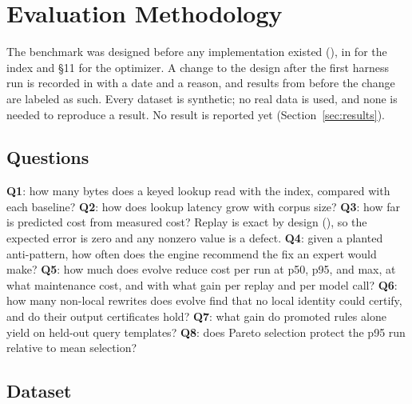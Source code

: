 \section{Evaluation Methodology}\label{sec:eval}

The benchmark was designed before any implementation existed (), in
 for the index and  \S11 for the optimizer.
A change to the design after the first harness run is recorded in
 with a date and a reason, and results from before the change
are labeled as such. Every dataset is synthetic; no real data is used, and none
is needed to reproduce a result. No result is reported yet
(Section~\ref{sec:results}).

\subsection{Questions}\label{sec:questions}

\textbf{Q1}: how many bytes does a keyed lookup read with the index, compared
with each baseline? \textbf{Q2}: how does lookup latency grow with corpus size?
\textbf{Q3}: how far is predicted cost from measured cost? Replay is exact by
design (), so the expected error is zero and any nonzero value is a
defect. \textbf{Q4}: given a planted anti-pattern, how often does the engine
recommend the fix an expert would make? \textbf{Q5}: how much does evolve reduce
cost per run at p50, p95, and max, at what maintenance cost, and with what gain
per replay and per model call? \textbf{Q6}: how many non-local rewrites does
evolve find that no local identity could certify, and do their output
certificates hold? \textbf{Q7}: what gain do promoted rules alone yield on
held-out query templates? \textbf{Q8}: does Pareto selection protect the p95
run relative to mean selection?

\subsection{Dataset}\label{sec:dataset}

